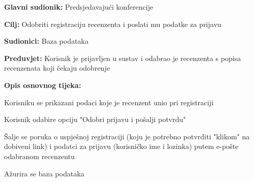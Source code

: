 					\noindent {}
					\begin{packed_item}
						
						\item \textbf{Glavni sudionik: } Predsjedavajući konferencije
						\item  \textbf{Cilj:} Odobriti registraciju recenzenta i poslati mu podatke za prijavu
						\item  \textbf{Sudionici:} Baza podataka
						\item  \textbf{Preduvjet:} Korisnik je prijavljen u sustav i odabrao je recenzenta s popisa recenzenata koji čekaju odobrenje
						\item  \textbf{Opis osnovnog tijeka:}
						
						\item[] \begin{packed_enum}
							
							
							\item Korisniku se prikazani podaci koje je recenzent unio pri registraciji
							\item Korisnik odabire opciju "Odobri prijavu i pošalji potvrdu"
							\item Šalje se poruka o uspješnoj registraciji (koju je potrebno potvrditi "klikom" na dobiveni link) i podatci za prijavu (korisničko ime i lozinka) putem e-pošte odabranom recenzentu
							\item Ažurira se baza podataka
							
							
						\end{packed_enum}
						
					\end{packed_item}
					
